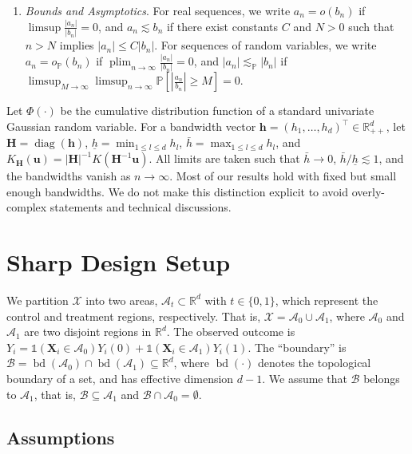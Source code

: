 \documentclass[10pt]{article}
\DeclareMathOperator*{\diag}{diag}
\DeclareMathOperator{\setbd}{bd}
\renewcommand{\P}{\mathbb{P}}
\newcommand{\Indicator}{\mathds{1}}
\newcommand{\lessp}{\lesssim_{\mathbb{P}}}
\newcommand{\bh}{\mathbf{h}}
\newcommand{\bH}{\mathbf{H}}
\newcommand{\bu}{\mathbf{u}}
\newcommand{\bX}{\mathbf{X}}
\newcommand{\A}{\mathcal{A}}
\newcommand{\B}{\mathcal{B}}
\begin{document}
\begin{enumerate}[label=(\roman*)]
    \item \textit{Bounds and Asymptotics}. For real sequences, we write $a_n = o(b_n)$ if $\limsup \frac{|a_n|}{|b_n|} = 0$, and $a_n \lesssim b_n$ if there exist constants $C$ and $N > 0$ such that $n > N$ implies $|a_n| \leq C |b_n|$. For sequences of random variables, we write $a_n = o_{\P}(b_n)$ if $\operatorname{plim}_{n \to \infty}\frac{|a_n|}{|b_n|} = 0$, and $|a_n| \lessp |b_n|$ if $\limsup_{M \to \infty} \limsup_{n \to \infty} \P[|\frac{a_n}{b_n}| \geq M] = 0$.

\end{enumerate}

Let $\Phi(\cdot)$ be the cumulative distribution function of a standard univariate Gaussian random variable.
For a bandwidth vector $\bh=(h_1,\ldots,h_d)^\top\in\mathbb{R}_{++}^d$, let $\bH=\diag(\bh)$, $\underline h=\min_{1\leq l\leq d}h_l$, $\bar{h}=\max_{1\leq l\leq d}h_l$, and $K_{\bH}(\bu)=|\bH|^{-1}K(\bH^{-1}\bu)$. All limits are taken such that $\bar{h}\to0$, $\bar{h}/\underline h\lesssim1$, and the bandwidths vanish as $n\to\infty$. Most of our results hold with fixed but small enough bandwidths. We do not make this distinction explicit to avoid overly-complex statements and technical discussions.


\section{Sharp Design Setup}

We partition $\mathcal{X}$ into two areas, $\A_t\subset\mathbb{R}^d$ with $t\in\{0,1\}$, which represent the control and treatment regions, respectively. That is, $\mathcal{X} = \A_0 \cup \A_1$, where $\A_0$ and $\A_1$ are two disjoint regions in $\mathbb{R}^d$. The observed outcome is $Y_i = \Indicator(\bX_i \in \A_0) Y_i(0) + \Indicator(\bX_i \in \A_1) Y_i(1)$. The ``boundary'' is $\B = \setbd(\A_0) \cap \setbd(\A_1) \subseteq\mathbb{R}^{d}$, where $\setbd(\cdot)$ denotes the topological boundary of a set, and has effective dimension $d-1$. We assume that $\B$ belongs to $\A_1$, that is, $\B \subseteq \A_1$ and $\B \cap \A_0 = \emptyset$.

\subsection{Assumptions}
\end{document}
